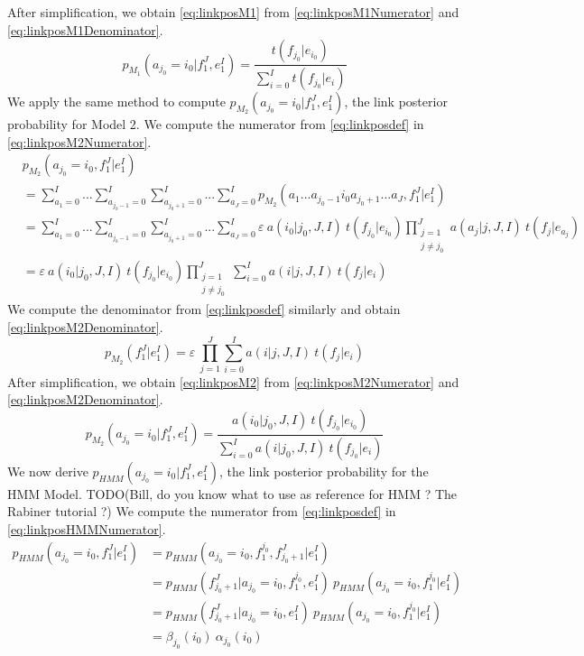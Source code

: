 %
After simplification, we obtain \autoref{eq:linkposM1} from
\autoref{eq:linkposM1Numerator} and \autoref{eq:linkposM1Denominator}.
%
\begin{equation} \label{eq:linkposM1}
  p_{M_1}(a_{j_0} = i_0 | f_1^J, e_1^I) = \frac{t(f_{j_0}|e_{i_0})}{\sum_{i=0}^I t(f_{j_0}|e_i)}
\end{equation}
%
We apply the same method to compute $p_{M_2}(a_{j_0} = i_0 | f_1^J, e_1^I)$, the
link posterior probability for Model 2.
We compute the numerator from \autoref{eq:linkposdef} in
\autoref{eq:linkposM2Numerator}.
%
\begin{align}
  & p_{M_2}(a_{j_0}=i_0,f_1^J|e_1^I) \nonumber \\
  &= \sum_{a_1 = 0}^{I} ... \sum_{a_{j_0-1} = 0}^{I} \sum_{a_{j_0+1} = 0}^{I} ... \sum_{a_J = 0}^{I} p_{M_2}(a_1 ... a_{j_0-1} i_0 a_{j_0+1} ... a_J,f_1^J|e_1^I) \nonumber \\
  &= \sum_{a_1 = 0}^{I} ... \sum_{a_{j_0-1} = 0}^{I} \sum_{a_{j_0+1} = 0}^{I} ... \sum_{a_J = 0}^{I} \varepsilon \ a(i_0 | j_0, J, I) \ t(f_{j_0}|e_{i_0}) \prod_{\substack{j = 1 \\ j \neq j_0}}^J a(a_j | j, J, I) \ t(f_j|e_{a_j}) \nonumber \\
  &= \varepsilon \ a(i_0 | j_0, J, I) \ t(f_{j_0}|e_{i_0}) \prod_{\substack{j = 1 \\ j \neq j_0}}^J \sum_{i=0}^I a(i | j, J, I) \ t(f_j|e_i) \label{eq:linkposM2Numerator}
\end{align}
%
We compute the denominator from \autoref{eq:linkposdef} similarly and obtain
\autoref{eq:linkposM2Denominator}.
%
\begin{equation} \label{eq:linkposM2Denominator}
  p_{M_2}(f_1^J|e_1^I) = \varepsilon \ \prod_{j=1}^J \sum_{i=0}^I a(i | j, J, I) \ t(f_j|e_i)
\end{equation}
%
After simplification, we obtain \autoref{eq:linkposM2} from
\autoref{eq:linkposM2Numerator} and \autoref{eq:linkposM2Denominator}.
%
\begin{equation} \label{eq:linkposM2}
  p_{M_2}(a_{j_0} = i_0 | f_1^J, e_1^I) = \frac{a(i_0 | j_0, J, I) \ t(f_{j_0} | e_{i_0})}{\sum_{i=0}^I a(i | j_0, J, I) \ t(f_{j_0}|e_i)}
\end{equation}
%
We now derive $p_{HMM}(a_{j_0} = i_0 | f_1^J, e_1^I)$, the link posterior
probability for the HMM Model.
TODO(Bill, do you know what to use as reference for HMM ? The Rabiner tutorial ?)
We compute the numerator from \autoref{eq:linkposdef} in
\autoref{eq:linkposHMMNumerator}.
%
\begin{align}
  p_{HMM}(a_{j_0} = i_0, f_1^J | e_1^I) &= p_{HMM}(a_{j_0} = i_0, f_1^{j_0}, f_{j_0 + 1}^J | e_1^I) \nonumber \\
                                        &= p_{HMM}(f_{j_0 + 1}^J | a_{j_0} = i_0, f_1^{j_0}, e_1^I) \ p_{HMM}(a_{j_0} = i_0, f_1^{j_0} | e_1^I) \nonumber \\
                                        &= p_{HMM}(f_{j_0 + 1}^J | a_{j_0} = i_0, e_1^I) \ p_{HMM}(a_{j_0} = i_0, f_1^{j_0} | e_1^I) \nonumber \\
                                        &= \beta_{j_0}(i_0) \ \alpha_{j_0}(i_0) \label{eq:linkposHMMNumerator}
\end{align}
